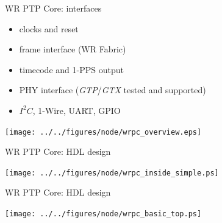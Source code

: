 \documentclass[compress,red]{beamer}
\newcommand{\backupend}{
   \addtocounter{framenumberappendix}{-\value{framenumber}}
   \addtocounter{framenumber}{\value{framenumberappendix}} 
}
\begin{document}
\begin{frame}{WR PTP Core: interfaces}
	\begin{itemize}
		\item clocks and reset
		\item frame interface (WR Fabric)
		\item timecode and 1-PPS output
		\item PHY interface (\emph{GTP}/\emph{GTX} tested and supported)
		\item $I^2C$, 1-Wire, UART, GPIO
	\end{itemize}
	\begin{center}
		\texttt{[image: ../../figures/node/wrpc\_overview.eps]}
	\end{center}
\end{frame}

\begin{frame}{WR PTP Core: HDL design}
	\begin{center}
	\texttt{[image: ../../figures/node/wrpc\_inside\_simple.ps]}
	\end{center}
\end{frame}
\begin{frame}{WR PTP Core: HDL design}
	\begin{center}
	\texttt{[image: ../../figures/node/wrpc\_basic\_top.ps]}
	\end{center}
\end{frame}


\backupend

\end{document}
